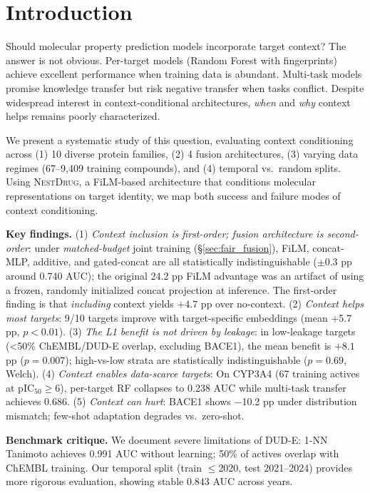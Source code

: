 \documentclass{article}
\newcommand{\methodname}{\textsc{NestDrug}}
\begin{document}
\section{Introduction}
\label{sec:intro}

Should molecular property prediction models incorporate target context? The answer is not obvious. Per-target models (Random Forest with fingerprints) achieve excellent performance when training data is abundant. Multi-task models promise knowledge transfer but risk negative transfer when tasks conflict. Despite widespread interest in context-conditional architectures, \textit{when} and \textit{why} context helps remains poorly characterized.

We present a systematic study of this question, evaluating context conditioning across (1) 10 diverse protein families, (2) 4 fusion architectures, (3) varying data regimes (67--9,409 training compounds), and (4) temporal vs.\ random splits. Using \methodname{}, a FiLM-based architecture \citep{perez_2018_film} that conditions molecular representations on target identity, we map both success and failure modes of context conditioning.

\textbf{Key findings.} (1) \textit{Context inclusion is first-order; fusion architecture is second-order}: under \emph{matched-budget} joint training (\S\ref{sec:fair_fusion}), FiLM, concat-MLP, additive, and gated-concat are all statistically indistinguishable ($\pm 0.3$ pp around 0.740 AUC); the original 24.2 pp FiLM advantage was an artifact of using a frozen, randomly initialized concat projection at inference. The first-order finding is that \emph{including} context yields $+4.7$ pp over no-context. (2) \textit{Context helps most targets}: 9/10 targets improve with target-specific embeddings (mean +5.7 pp, $p < 0.01$). (3) \textit{The L1 benefit is not driven by leakage}: in low-leakage targets (\textless 50\% ChEMBL/DUD-E overlap, excluding BACE1), the mean benefit is $+8.1$ pp ($p = 0.007$); high-vs-low strata are statistically indistinguishable ($p = 0.69$, Welch). (4) \textit{Context enables data-scarce targets}: On CYP3A4 (67 training actives at pIC$_{50}\geq 6$), per-target RF collapses to 0.238 AUC while multi-task transfer achieves 0.686. (5) \textit{Context can hurt}: BACE1 shows $-$10.2 pp under distribution mismatch; few-shot adaptation degrades vs.\ zero-shot.

\textbf{Benchmark critique.} We document severe limitations of DUD-E: 1-NN Tanimoto achieves 0.991 AUC without learning; 50\% of actives overlap with ChEMBL training. Our temporal split (train $\leq$2020, test 2021--2024) provides more rigorous evaluation, showing stable 0.843 AUC across years.
\end{document}
